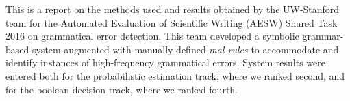 This is a report on the methods used and results obtained by the UW-Stanford team for the Automated Evaluation of Scientific Writing (AESW) Shared Task 2016 on grammatical error detection.  This team developed a symbolic grammar-based system augmented with manually defined {\em mal-rules} to accommodate and identify instances of high-frequency grammatical errors.   System results were entered both for the probabilistic estimation track, where we ranked second, and for the boolean decision track, where we ranked fourth.
